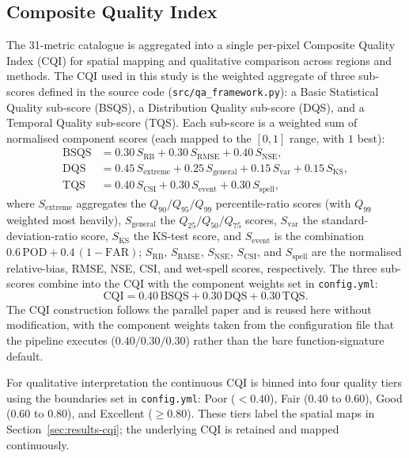 \subsection{Composite Quality Index}

The 31-metric catalogue is aggregated into a single per-pixel
Composite Quality Index (CQI) for spatial mapping and qualitative
comparison across regions and methods. The CQI used in this
study is the weighted aggregate of three sub-scores defined in
the source code (\texttt{src/qa\_framework.py}): a Basic
Statistical Quality sub-score (BSQS), a Distribution Quality
sub-score (DQS), and a Temporal Quality sub-score (TQS). Each
sub-score is a weighted sum of normalised component scores
(each mapped to the $[0, 1]$ range, with $1$ best):
\begin{align}
\text{BSQS} &= 0.30\,S_{\text{RB}} + 0.30\,S_{\text{RMSE}}
             + 0.40\,S_{\text{NSE}}, \label{eq:bsqs} \\
\text{DQS}  &= 0.45\,S_{\text{extreme}} + 0.25\,S_{\text{general}}
             + 0.15\,S_{\text{var}} + 0.15\,S_{\text{KS}},
             \label{eq:dqs} \\
\text{TQS}  &= 0.40\,S_{\text{CSI}} + 0.30\,S_{\text{event}}
             + 0.30\,S_{\text{spell}}, \label{eq:tqs}
\end{align}
where $S_{\text{extreme}}$ aggregates the $Q_{90}/Q_{95}/Q_{99}$
percentile-ratio scores (with $Q_{99}$ weighted most heavily),
$S_{\text{general}}$ the $Q_{25}/Q_{50}/Q_{75}$ scores,
$S_{\text{var}}$ the standard-deviation-ratio score,
$S_{\text{KS}}$ the KS-test score, and $S_{\text{event}}$ is the
combination $0.6\,\text{POD} + 0.4\,(1 - \text{FAR})$;
$S_{\text{RB}}$, $S_{\text{RMSE}}$, $S_{\text{NSE}}$,
$S_{\text{CSI}}$, and $S_{\text{spell}}$ are the normalised
relative-bias, RMSE, NSE, CSI, and wet-spell scores, respectively.
The three
sub-scores combine into the CQI with the component weights set in
\texttt{config.yml}:
\begin{equation}
\text{CQI} = 0.40\,\text{BSQS} + 0.30\,\text{DQS}
           + 0.30\,\text{TQS}.
\label{eq:cqi}
\end{equation}
The CQI construction follows the parallel paper
\citep{ref:istanto2026mdpi}\MDPIstatus and is reused here without
modification, with the component weights taken from the
configuration file that the pipeline executes
($0.40/0.30/0.30$) rather than the bare function-signature
default.

For qualitative interpretation the continuous CQI is binned into
four quality tiers using the boundaries set in \texttt{config.yml}:
Poor ($<0.40$), Fair ($0.40$ to $0.60$), Good ($0.60$ to $0.80$),
and Excellent ($\geq 0.80$). These tiers label the spatial maps in
Section~\ref{sec:results-cqi}; the underlying CQI is retained and
mapped continuously.

